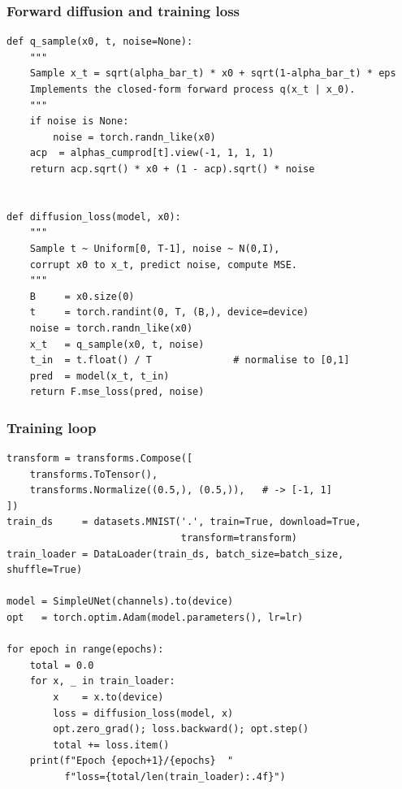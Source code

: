 \documentclass{beamer}
\begin{document}
\begin{frame}
\frametitle{Forward diffusion and training loss}

\begin{verbatim}
def q_sample(x0, t, noise=None):
    """
    Sample x_t = sqrt(alpha_bar_t) * x0 + sqrt(1-alpha_bar_t) * eps
    Implements the closed-form forward process q(x_t | x_0).
    """
    if noise is None:
        noise = torch.randn_like(x0)
    acp  = alphas_cumprod[t].view(-1, 1, 1, 1)
    return acp.sqrt() * x0 + (1 - acp).sqrt() * noise


def diffusion_loss(model, x0):
    """
    Sample t ~ Uniform[0, T-1], noise ~ N(0,I),
    corrupt x0 to x_t, predict noise, compute MSE.
    """
    B     = x0.size(0)
    t     = torch.randint(0, T, (B,), device=device)
    noise = torch.randn_like(x0)
    x_t   = q_sample(x0, t, noise)
    t_in  = t.float() / T              # normalise to [0,1]
    pred  = model(x_t, t_in)
    return F.mse_loss(pred, noise)
\end{verbatim}
\end{frame}

\begin{frame}
\frametitle{Training loop}

\begin{verbatim}
transform = transforms.Compose([
    transforms.ToTensor(),
    transforms.Normalize((0.5,), (0.5,)),   # -> [-1, 1]
])
train_ds     = datasets.MNIST('.', train=True, download=True,
                              transform=transform)
train_loader = DataLoader(train_ds, batch_size=batch_size, shuffle=True)

model = SimpleUNet(channels).to(device)
opt   = torch.optim.Adam(model.parameters(), lr=lr)

for epoch in range(epochs):
    total = 0.0
    for x, _ in train_loader:
        x    = x.to(device)
        loss = diffusion_loss(model, x)
        opt.zero_grad(); loss.backward(); opt.step()
        total += loss.item()
    print(f"Epoch {epoch+1}/{epochs}  "
          f"loss={total/len(train_loader):.4f}")
\end{verbatim}
\end{frame}
\end{document}
